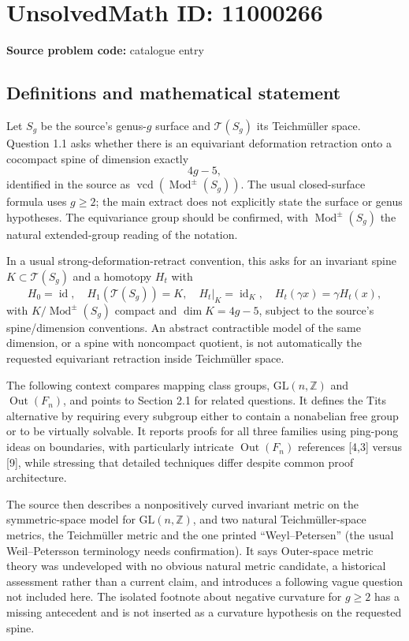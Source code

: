 \documentclass[11pt]{article}
\newcommand{\Z}{\mathbb{Z}}
\begin{document}
\section*{UnsolvedMath ID: 11000266}
\textbf{Source problem code:} catalogue entry
\subsection{Definitions and mathematical statement}
Let \(S_g\) be the source's genus-\(g\) surface and \(\mathcal T(S_g)\) its Teichmüller space. Question 1.1 asks whether there is an equivariant deformation retraction onto a cocompact spine of dimension exactly
\[
 4g-5,
\]
identified in the source as \(\operatorname{vcd}(\operatorname{Mod}^{\pm}(S_g))\). The usual closed-surface formula uses \(g\ge2\); the main extract does not explicitly state the surface or genus hypotheses. The equivariance group should be confirmed, with \(\operatorname{Mod}^{\pm}(S_g)\) the natural extended-group reading of the notation.

In a usual strong-deformation-retract convention, this asks for an invariant spine \(K\subset\mathcal T(S_g)\) and a homotopy \(H_t\) with
\[
 H_0=\operatorname{id},\quad H_1(\mathcal T(S_g))=K,
 \quad H_t|_K=\operatorname{id}_K,\quad
 H_t(\gamma x)=\gamma H_t(x),
\]
with \(K/\operatorname{Mod}^{\pm}(S_g)\) compact and \(\dim K=4g-5\), subject to the source's spine/dimension conventions. An abstract contractible model of the same dimension, or a spine with noncompact quotient, is not automatically the requested equivariant retraction inside Teichmüller space.

The following context compares mapping class groups, \(\mathrm{GL}(n,\Z)\) and \(\operatorname{Out}(F_n)\), and points to Section 2.1 for related questions. It defines the Tits alternative by requiring every subgroup either to contain a nonabelian free group or to be virtually solvable. It reports proofs for all three families using ping-pong ideas on boundaries, with particularly intricate \(\operatorname{Out}(F_n)\) references [4,3] versus [9], while stressing that detailed techniques differ despite common proof architecture.

The source then describes a nonpositively curved invariant metric on the symmetric-space model for \(\mathrm{GL}(n,\Z)\), and two natural Teichmüller-space metrics, the Teichmüller metric and the one printed ``Weyl--Petersen'' (the usual Weil--Petersson terminology needs confirmation). It says Outer-space metric theory was undeveloped with no obvious natural metric candidate, a historical assessment rather than a current claim, and introduces a following vague question not included here. The isolated footnote about negative curvature for \(g\ge2\) has a missing antecedent and is not inserted as a curvature hypothesis on the requested spine.
\end{document}
